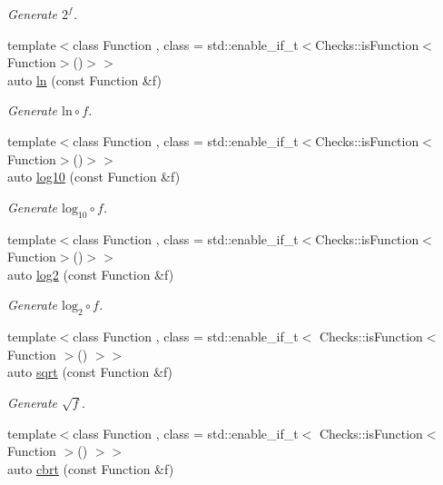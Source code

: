 \begin{DoxyCompactItemize}
\begin{DoxyCompactList}\small\item\em Generate $2^f$. \end{DoxyCompactList}\item 
{\footnotesize template$<$class Function , class  = std\-::enable\-\_\-if\-\_\-t$<$\-Checks\-::is\-Function$<$\-Function$>$()$>$$>$ }\\auto \hyperlink{group__CMathGroup_gaa1ca40e2b0c36709978b91836435b0c5}{ln} (const Function \&f)
\begin{DoxyCompactList}\small\item\em Generate $ \mathrm{ln}\circ f $. \end{DoxyCompactList}\item 
{\footnotesize template$<$class Function , class  = std\-::enable\-\_\-if\-\_\-t$<$\-Checks\-::is\-Function$<$\-Function$>$()$>$$>$ }\\auto \hyperlink{group__CMathGroup_ga29cb2c4b2fb13040a351e685fc3f8b03}{log10} (const Function \&f)
\begin{DoxyCompactList}\small\item\em Generate $ \mathrm{log}_{10}\circ f $. \end{DoxyCompactList}\item 
{\footnotesize template$<$class Function , class  = std\-::enable\-\_\-if\-\_\-t$<$\-Checks\-::is\-Function$<$\-Function$>$()$>$$>$ }\\auto \hyperlink{group__CMathGroup_gab619c71bd55d049c827d8f2af2a939d3}{log2} (const Function \&f)
\begin{DoxyCompactList}\small\item\em Generate $ \mathrm{log}_{2}\circ f $. \end{DoxyCompactList}\item 
{\footnotesize template$<$class Function , class  = std\-::enable\-\_\-if\-\_\-t$<$ Checks\-::is\-Function$<$ Function $>$() $>$$>$ }\\auto \hyperlink{group__CMathGroup_ga1c180bd87b8817342b34d72dddd11266}{sqrt} (const Function \&f)
\begin{DoxyCompactList}\small\item\em Generate $ \sqrt{f} $. \end{DoxyCompactList}\item 
{\footnotesize template$<$class Function , class  = std\-::enable\-\_\-if\-\_\-t$<$ Checks\-::is\-Function$<$ Function $>$() $>$$>$ }\\auto \hyperlink{group__CMathGroup_gae8e97f84bd4000935069a87133173d4c}{cbrt} (const Function \&f)

\end{DoxyCompactItemize}
